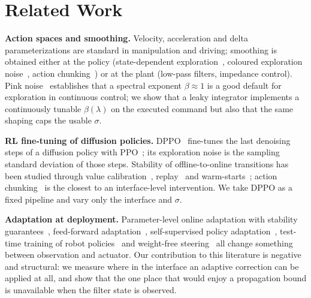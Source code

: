 \documentclass[conference]{IEEEtran}
\begin{document}
\section{Related Work}

\textbf{Action spaces and smoothing.} Velocity, acceleration and delta parameterizations are standard in manipulation and driving; smoothing is obtained either at the policy (state-dependent exploration~\cite{raffin2021smoothexplorationroboticreinforcement}, coloured exploration noise~\cite{eberhard2023pink}, action chunking~\cite{li2026reinforcementlearningactionchunking,chen2026dreamchunkreactiveactionchunking}) or at the plant (low-pass filters, impedance control). Pink noise~\cite{eberhard2023pink} establishes that a spectral exponent $\beta\approx1$ is a good default for exploration in continuous control; we show that a leaky integrator implements a continuously tunable $\beta(\lambda)$ on the executed command but also that the same shaping caps the usable $\sigma$.

\textbf{RL fine-tuning of diffusion policies.} DPPO~\cite{ren2024diffusionpolicypolicyoptimization} fine-tunes the last denoising steps of a diffusion policy with PPO~\cite{schulman2017ppo}; its exploration noise is the sampling standard deviation of those steps. Stability of offline-to-online transitions has been studied through value calibration~\cite{nakamoto2024calqlcalibratedofflinerl}, replay~\cite{ball2023efficientonlinereinforcementlearning} and warm-starts~\cite{zhou2025efficientonlinereinforcementlearning}; action chunking~\cite{li2026reinforcementlearningactionchunking} is the closest to an interface-level intervention. We take DPPO as a fixed pipeline and vary only the interface and $\sigma$.

\textbf{Adaptation at deployment.} Parameter-level online adaptation with stability guarantees~\cite{oconnell2024neuralflyenablesrapidlearning}, feed-forward adaptation~\cite{kumar2021rmarapidmotoradaptation}, self-supervised policy adaptation~\cite{hansen2021selfsupervisedpolicyadaptationdeployment}, test-time training of robot policies~\cite{jiang2026robotttcontextscalingrobot,sima2025centaurrobustendtoendautonomous,zhang2026tttvlatesttimelatentprompt} and weight-free steering~\cite{wagenmaker2025steeringdiffusionpolicylatent,muttaqien2026orpaonlineresidualpolicy} all change something between observation and actuator. Our contribution to this literature is negative and structural: we measure where in the interface an adaptive correction can be applied at all, and show that the one place that would enjoy a propagation bound is unavailable when the filter state is observed.
\end{document}
